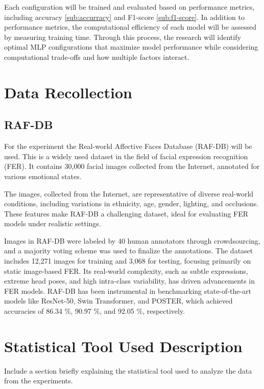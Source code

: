Each configuration will be trained and evaluated based on performance metrics, including  accuracy \ref{sub:accurracy} and F1-score \ref{sub:f1-score}. In addition to performance metrics, the computational efficiency of each model will be assessed by measuring training time.  Through this process, the research will identify optimal MLP configurations that maximize model performance while considering computational trade-offs and how multiple factors interact.

\section{Data Recollection}

\subsection{RAF-DB} \label{sub:raf-db}

For the experiment the  Real-world Affective Faces Database (RAF-DB) will be used. This is a widely used dataset in the field of facial expression recognition (FER). It contains 30,000 facial images collected from the Internet, annotated for various emotional states. 

The images, collected from the Internet, are representative of diverse real-world conditions, including variations in ethnicity, age, gender, lighting, and occlusions. These features make RAF-DB a challenging dataset, ideal for evaluating FER models under realistic settings.

Images in RAF-DB were labeled by 40 human annotators through crowdsourcing, and a majority voting scheme was used to finalize the annotations. The dataset includes 12,271 images for training and 3,068 for testing, focusing primarily on static image-based FER. Its real-world complexity, such as subtle expressions, extreme head poses, and high intra-class variability, has driven advancements in FER models. RAF-DB has been instrumental in benchmarking state-of-the-art models like ResNet-50, Swin Transformer, and POSTER, which achieved accuracies of 86.34 \%, 90.97 \%, and 92.05 \%, respectively.

\section{Statistical Tool Used Description}

Include a section briefly explaining the statistical tool used to analyze the data from the experiments.

